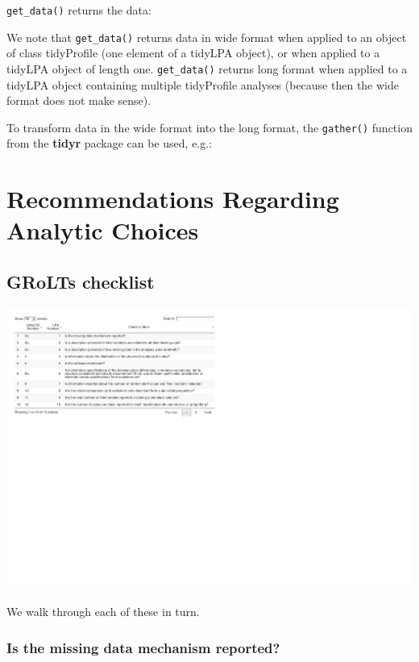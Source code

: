 \documentclass[
  english,
  man]{apa6}
\begin{document}
\texttt{get\_data()} returns the data:

We note that \texttt{get\_data()} returns data in wide format when applied to an object
of class tidyProfile (one element of a tidyLPA object), or when applied to a
tidyLPA object of length one. \texttt{get\_data()} returns long format when applied to a
tidyLPA object containing multiple tidyProfile analyses (because then the wide
format does not make sense).

To transform data in the wide format into the long format, the \texttt{gather()}
function from the \textbf{tidyr} package can be used, e.g.:

\hypertarget{recommendations-regarding-analytic-choices}{%
\section{Recommendations Regarding Analytic Choices}\label{recommendations-regarding-analytic-choices}}

\hypertarget{grolts-checklist}{%
\subsection{GRoLTs checklist}\label{grolts-checklist}}

\includegraphics{paper_files/figure-latex/unnamed-chunk-14-1.pdf}

We walk through each of these in turn.

\hypertarget{is-the-missing-data-mechanism-reported}{%
\subsubsection{Is the missing data mechanism reported?}\label{is-the-missing-data-mechanism-reported}}
\end{document}
